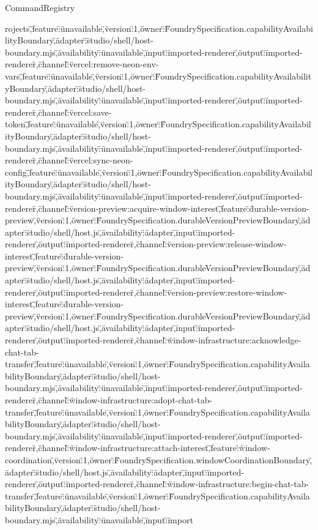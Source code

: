\begin{lexlean}{CommandRegistry}
\begin{semanticmodule}
{rojects\",\"feature\":\"unavailable\",\"version\":1,\"owner\":\"FoundrySpecification.capabilityAvailabilityBoundary\",\"adapter\":\"studio/shell/host-boundary.mjs\",\"availability\":\"unavailable\",\"input\":\"imported-renderer\",\"output\":\"imported-renderer\"},{\"channel\":\"vercel:remove-neon-env-vars\",\"feature\":\"unavailable\",\"version\":1,\"owner\":\"FoundrySpecification.capabilityAvailabilityBoundary\",\"adapter\":\"studio/shell/host-boundary.mjs\",\"availability\":\"unavailable\",\"input\":\"imported-renderer\",\"output\":\"imported-renderer\"},{\"channel\":\"vercel:save-token\",\"feature\":\"unavailable\",\"version\":1,\"owner\":\"FoundrySpecification.capabilityAvailabilityBoundary\",\"adapter\":\"studio/shell/host-boundary.mjs\",\"availability\":\"unavailable\",\"input\":\"imported-renderer\",\"output\":\"imported-renderer\"},{\"channel\":\"vercel:sync-neon-config\",\"feature\":\"unavailable\",\"version\":1,\"owner\":\"FoundrySpecification.capabilityAvailabilityBoundary\",\"adapter\":\"studio/shell/host-boundary.mjs\",\"availability\":\"unavailable\",\"input\":\"imported-renderer\",\"output\":\"imported-renderer\"},{\"channel\":\"version-preview:acquire-window-interest\",\"feature\":\"durable-version-preview\",\"version\":1,\"owner\":\"FoundrySpecification.durableVersionPreviewBoundary\",\"adapter\":\"studio/shell/host.js\",\"availability\":\"adapter\",\"input\":\"imported-renderer\",\"output\":\"imported-renderer\"},{\"channel\":\"version-preview:release-window-interest\",\"feature\":\"durable-version-preview\",\"version\":1,\"owner\":\"FoundrySpecification.durableVersionPreviewBoundary\",\"adapter\":\"studio/shell/host.js\",\"availability\":\"adapter\",\"input\":\"imported-renderer\",\"output\":\"imported-renderer\"},{\"channel\":\"version-preview:restore-window-interest\",\"feature\":\"durable-version-preview\",\"version\":1,\"owner\":\"FoundrySpecification.durableVersionPreviewBoundary\",\"adapter\":\"studio/shell/host.js\",\"availability\":\"adapter\",\"input\":\"imported-renderer\",\"output\":\"imported-renderer\"},{\"channel\":\"window-infrastructure:acknowledge-chat-tab-transfer\",\"feature\":\"unavailable\",\"version\":1,\"owner\":\"FoundrySpecification.capabilityAvailabilityBoundary\",\"adapter\":\"studio/shell/host-boundary.mjs\",\"availability\":\"unavailable\",\"input\":\"imported-renderer\",\"output\":\"imported-renderer\"},{\"channel\":\"window-infrastructure:adopt-chat-tab-transfer\",\"feature\":\"unavailable\",\"version\":1,\"owner\":\"FoundrySpecification.capabilityAvailabilityBoundary\",\"adapter\":\"studio/shell/host-boundary.mjs\",\"availability\":\"unavailable\",\"input\":\"imported-renderer\",\"output\":\"imported-renderer\"},{\"channel\":\"window-infrastructure:attach-interest\",\"feature\":\"window-coordination\",\"version\":1,\"owner\":\"FoundrySpecification.windowCoordinationBoundary\",\"adapter\":\"studio/shell/host.js\",\"availability\":\"adapter\",\"input\":\"imported-renderer\",\"output\":\"imported-renderer\"},{\"channel\":\"window-infrastructure:begin-chat-tab-transfer\",\"feature\":\"unavailable\",\"version\":1,\"owner\":\"FoundrySpecification.capabilityAvailabilityBoundary\",\"adapter\":\"studio/shell/host-boundary.mjs\",\"availability\":\"unavailable\",\"input\":\"import}
\end{semanticmodule}
\end{lexlean}
